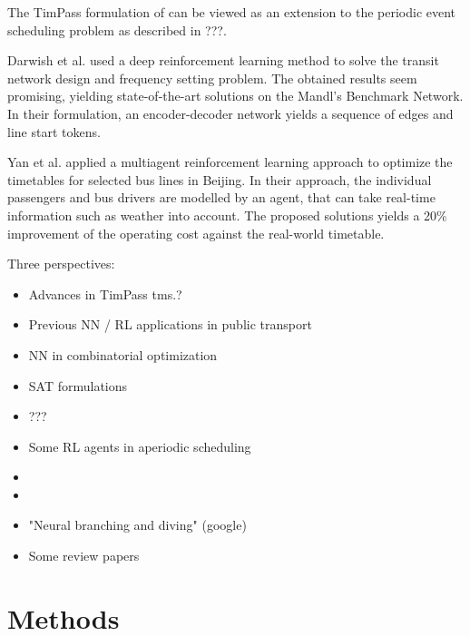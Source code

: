 \documentclass[english, 12pt, a4paper, sci, utf8, a-2b, online]{aaltothesis}
\begin{document}
The TimPass formulation of \cite{schiewe2020periodic} can be viewed as an extension to the periodic event scheduling problem as described in ???. 


Darwish et al. \cite{darwish2020optimising} used a deep reinforcement learning method to solve the transit network design and frequency setting problem. The obtained results seem promising, yielding state-of-the-art solutions on the Mandl's Benchmark Network. In their formulation, an encoder-decoder network yields a sequence of edges and line start tokens.

Yan et al. \cite{yan2022distributed} applied a multiagent reinforcement learning approach to optimize the timetables for selected bus lines in Beijing. In their approach, the individual passengers and bus drivers are modelled by an agent, that can take real-time information such as weather into account. The proposed solutions yields a 20\% improvement of the operating cost against the real-world timetable.






Three perspectives:
\begin{itemize}
        \item Advances in TimPass tms.?
        \item Previous NN / RL applications in public transport
        \item NN in combinatorial optimization
\end{itemize}

\begin{itemize}
    \item SAT formulations
    \item ???
\end{itemize}

\begin{itemize}
    \item Some RL agents in aperiodic scheduling
    \item 
    \item 
\end{itemize}

\begin{itemize}
    \item "Neural branching and diving" (google)
    \item Some review papers
\end{itemize}

\clearpage
\section{Methods}
\end{document}
